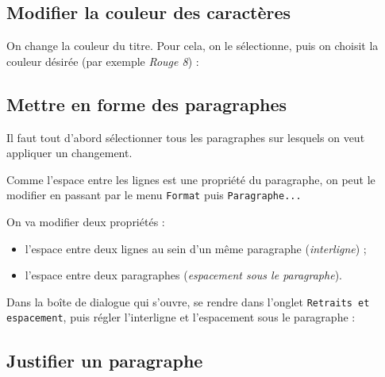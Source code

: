 \subsection{Modifier la couleur des caractères} 


On change la couleur du titre. Pour cela, on le sélectionne, puis on choisit la couleur désirée (par exemple \emph{Rouge 8}) :











\subsection{Mettre en forme des paragraphes} 



Il faut tout d'abord sélectionner tous les paragraphes sur lesquels on veut appliquer un changement.

Comme l'espace entre les lignes est une propriété du paragraphe, on peut le modifier en passant par le menu \texttt{Format} puis \texttt{Paragraphe...}

On va modifier deux propriétés : 
\begin{itemize}
\item l'espace entre deux lignes au sein d'un même paragraphe (\emph{interligne}) ;
\item l'espace entre deux paragraphes (\emph{espacement sous le paragraphe}).
\end{itemize}



Dans la boîte de dialogue qui s'ouvre, se rendre dans l'onglet \texttt{Retraits et espacement}, puis régler l'interligne et l'espacement sous le paragraphe :  








\subsection{Justifier un paragraphe}

